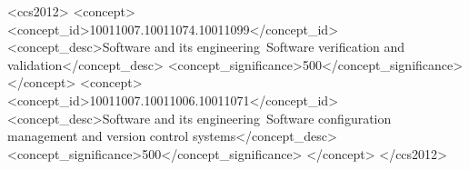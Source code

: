 \documentclass[sigconf,screen]{acmart}
\begin{document}
\title{\PaperTitle}

\author{Simarjot Khanna}

\begin{abstract}

\end{abstract}

\begin{CCSXML}
<ccs2012>
<concept>
<concept_id>10011007.10011074.10011099</concept_id>
<concept_desc>Software and its engineering~Software verification and validation</concept_desc>
<concept_significance>500</concept_significance>
</concept>
<concept>
<concept_id>10011007.10011006.10011071</concept_id>
<concept_desc>Software and its engineering~Software configuration management and version control systems</concept_desc>
<concept_significance>500</concept_significance>
</concept>
</ccs2012>
\end{CCSXML}


\maketitle



\balance


\end{document}

